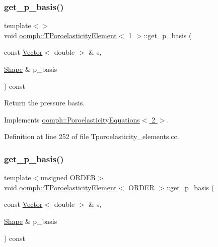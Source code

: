 \subsubsection{\texorpdfstring{get\+\_\+p\+\_\+basis()}{get\_p\_basis()}\hspace{0.1cm}{\footnotesize\ttfamily [2/3]}}
{\footnotesize\ttfamily template$<$$>$ \\
void \hyperlink{classoomph_1_1TPoroelasticityElement}{oomph\+::\+T\+Poroelasticity\+Element}$<$ 1 $>$\+::get\+\_\+p\+\_\+basis (\begin{DoxyParamCaption}\item[{const \hyperlink{classoomph_1_1Vector}{Vector}$<$ double $>$ \&}]{s,  }\item[{\hyperlink{classoomph_1_1Shape}{Shape} \&}]{p\+\_\+basis }\end{DoxyParamCaption}) const\hspace{0.3cm}{\ttfamily [virtual]}}



Return the pressure basis. 



Implements \hyperlink{classoomph_1_1PoroelasticityEquations_af5dd9aa31ee8da161285e7ed6b7cb8fc}{oomph\+::\+Poroelasticity\+Equations$<$ 2 $>$}.



Definition at line 252 of file Tporoelasticity\+\_\+elements.\+cc.

\mbox{\label{classoomph_1_1TPoroelasticityElement_a4f319ec9f7c2ce3cb871c060d35bc5e3}} 
\subsubsection{\texorpdfstring{get\+\_\+p\+\_\+basis()}{get\_p\_basis()}\hspace{0.1cm}{\footnotesize\ttfamily [3/3]}}
{\footnotesize\ttfamily template$<$unsigned O\+R\+D\+ER$>$ \\
void \hyperlink{classoomph_1_1TPoroelasticityElement}{oomph\+::\+T\+Poroelasticity\+Element}$<$ O\+R\+D\+ER $>$\+::get\+\_\+p\+\_\+basis (\begin{DoxyParamCaption}\item[{const \hyperlink{classoomph_1_1Vector}{Vector}$<$ double $>$ \&}]{s,  }\item[{\hyperlink{classoomph_1_1Shape}{Shape} \&}]{p\+\_\+basis }\end{DoxyParamCaption}) const\hspace{0.3cm}{\ttfamily [virtual]}}



